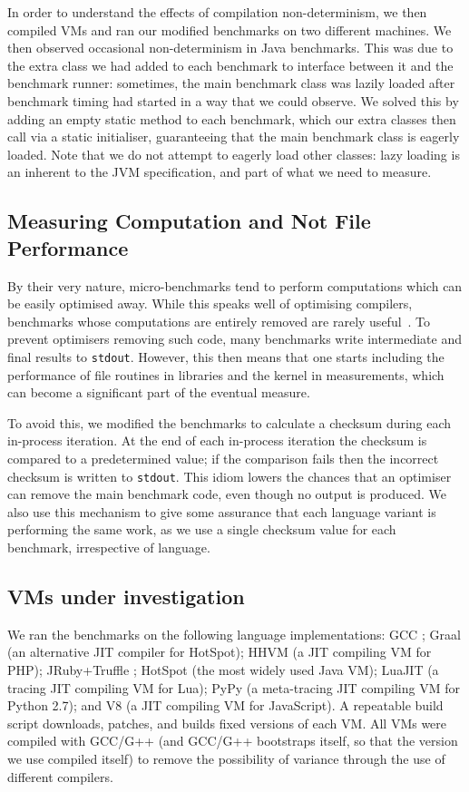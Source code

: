 \documentclass[acmlarge]{acmart}\settopmatter{printfolios=true}
\begin{document}
In order to understand the effects of compilation non-determinism,
we then compiled VMs and ran our modified benchmarks on two different machines.
We then observed occasional non-determinism in Java benchmarks.
This was due to the extra class we had added to each benchmark
to interface between it and the benchmark runner: sometimes, the
main benchmark class was lazily loaded after benchmark timing had started in a
way that we could observe. We
solved this by adding an empty static method to each benchmark, which our
extra classes then call via a static initialiser, guaranteeing that
the main benchmark class is eagerly loaded. Note that we do not attempt to eagerly
load other classes: lazy loading is an inherent to the JVM specification,
and part of what we need to measure.


\subsection{Measuring Computation and Not File Performance}

By their very nature, micro-benchmarks tend to perform computations which
can be easily optimised away. While this speaks well of
optimising compilers, benchmarks whose computations
are entirely removed are rarely useful~\cite{seaton15phd}. To prevent optimisers
removing such code, many benchmarks write intermediate and final results
to \texttt{stdout}. However, this then means that one starts including
the performance of file routines in libraries and the kernel in measurements,
which can become a significant part of the eventual measure.

To avoid this, we modified the benchmarks to calculate a checksum
during each in-process iteration. At the end of each in-process iteration
the checksum is compared to a predetermined value; if the comparison fails then
the incorrect checksum is written to \texttt{stdout}. This idiom
lowers the chances that an optimiser can remove the main benchmark
code, even though no output is produced. We also use this mechanism to give some assurance
that each language variant is performing the same work, as we use a single
checksum value for each benchmark, irrespective of language.


\subsection{VMs under investigation}

We ran the benchmarks on the following language implementations: GCC \gccversion;
Graal \graalversion (an alternative JIT compiler for HotSpot); HHVM \hhvmversion (a JIT
compiling VM for PHP); JRuby+Truffle \jrubytruffleversion{};
HotSpot \hotspotversion (the most widely used Java
VM); LuaJIT \luajitversion (a tracing JIT compiling VM for Lua); PyPy \pypyversion (a
meta-tracing JIT compiling VM for Python 2.7); and V8 \veightversion (a JIT
compiling VM for JavaScript). A repeatable build script downloads, patches,
and builds fixed versions of each VM. All VMs were compiled with GCC/G++ \gccversion
(and GCC/G++ bootstraps itself, so that the version we use compiled itself)
to remove the possibility of variance through the use of different compilers.
\end{document}
